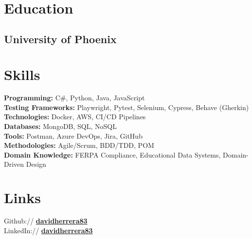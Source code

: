 \documentclass[hmargin=1.5cm, vmargin=1.5cm, scale=0.94]{deedy-resume-openfont}
\begin{document}
\lastupdated


\begin{minipage}[t]{0.33\textwidth}

\section{Education}
\subsection{University of Phoenix}
\sectionsep

\section{Skills}
\textbf{Programming:} C\#, Python, Java, JavaScript \\
\textbf{Testing Frameworks:} Playwright, Pytest, Selenium, Cypress, Behave (Gherkin) \\
\textbf{Technologies:} Docker, AWS, CI/CD Pipelines \\
\textbf{Databases:} MongoDB, SQL, NoSQL \\
\textbf{Tools:} Postman, Azure DevOps, Jira, GitHub \\
\textbf{Methodologies:} Agile/Scrum, BDD/TDD, POM \\
\textbf{Domain Knowledge:} FERPA Compliance, Educational Data Systems, Domain-Driven Design
\sectionsep

\section{Links}
Github:// \href{https://github.com/davidherrera83}{\bf davidherrera83} \\
LinkedIn:// \href{https://www.linkedin.com/in/davidherrera83}{\bf davidherrera83} \\
\sectionsep


\end{minipage}
\end{document}
